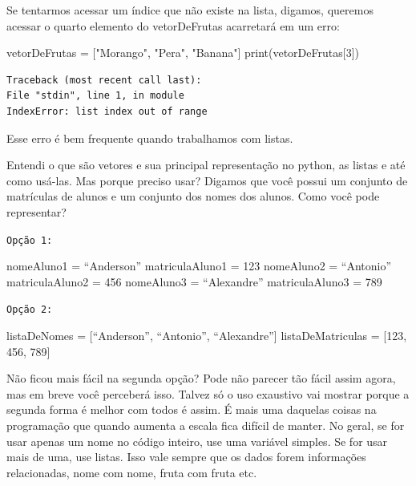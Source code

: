 \documentclass[
  letterpaper,
  DIV=11,
  numbers=noendperiod]{scrreprt}
\newenvironment{Shaded}{\begin{snugshade}}{\end{snugshade}}
\newcommand{\BuiltInTok}[1]{\textcolor[rgb]{0.00,0.23,0.31}{#1}}
\newcommand{\DecValTok}[1]{\textcolor[rgb]{0.68,0.00,0.00}{#1}}
\newcommand{\NormalTok}[1]{\textcolor[rgb]{0.00,0.23,0.31}{#1}}
\newcommand{\OperatorTok}[1]{\textcolor[rgb]{0.37,0.37,0.37}{#1}}
\newcommand{\StringTok}[1]{\textcolor[rgb]{0.13,0.47,0.30}{#1}}
\begin{document}
Se tentarmos acessar um índice que não existe na lista, digamos,
queremos acessar o quarto elemento do vetorDeFrutas acarretará em um
erro:

\begin{Shaded}
\begin{Highlighting}[]
\NormalTok{vetorDeFrutas }\OperatorTok{=}\NormalTok{ [}\StringTok{"Morango"}\NormalTok{, }\StringTok{"Pera"}\NormalTok{, }\StringTok{"Banana"}\NormalTok{]}
\BuiltInTok{print}\NormalTok{(vetorDeFrutas[}\DecValTok{3}\NormalTok{])}
\end{Highlighting}
\end{Shaded}

\begin{tcolorbox}[enhanced jigsaw, breakable, leftrule=.75mm, left=2mm, opacityback=0, bottomrule=.15mm, toprule=.15mm, rightrule=.15mm, arc=.35mm, colback=white]

\begin{verbatim}
Traceback (most recent call last):
File "stdin", line 1, in module
IndexError: list index out of range
\end{verbatim}

\end{tcolorbox}

Esse erro é bem frequente quando trabalhamos com listas.

Entendi o que são vetores e sua principal representação no python, as
listas e até como usá-las. Mas porque preciso usar? Digamos que você
possui um conjunto de matrículas de alunos e um conjunto dos nomes dos
alunos. Como você pode representar?

\texttt{Opção\ 1:}

nomeAluno1 = ``Anderson'' matriculaAluno1 = 123 nomeAluno2 = ``Antonio''
matriculaAluno2 = 456 nomeAluno3 = ``Alexandre'' matriculaAluno3 = 789

\texttt{Opção\ 2:}

listaDeNomes = {[}``Anderson'', ``Antonio'', ``Alexandre''{]}
listaDeMatriculas = {[}123, 456, 789{]}

Não ficou mais fácil na segunda opção? Pode não parecer tão fácil assim
agora, mas em breve você perceberá isso. Talvez só o uso exaustivo vai
mostrar porque a segunda forma é melhor com todos é assim. É mais uma
daquelas coisas na programação que quando aumenta a escala fica difícil
de manter. No geral, se for usar apenas um nome no código inteiro, use
uma variável simples. Se for usar mais de uma, use listas. Isso vale
sempre que os dados forem informações relacionadas, nome com nome, fruta
com fruta etc.
\end{document}
